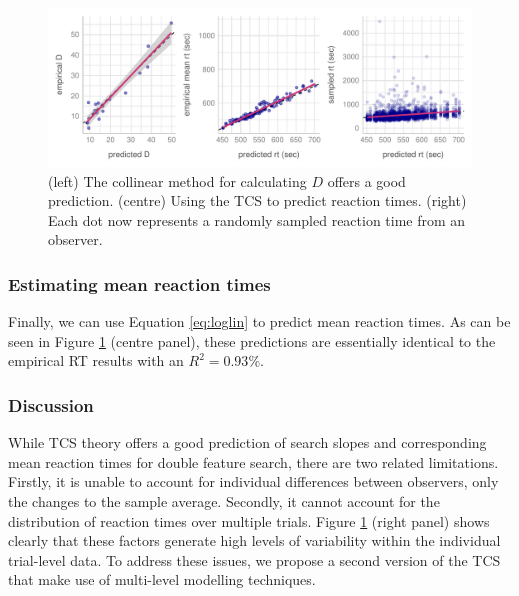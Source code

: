 \documentclass[smallextended, natbib]{svjour3}       %
\begin{document}
\begin{figure}
\centering
\includegraphics[width=\textwidth]{../plots/computational_replication.pdf}
\caption{(left) The collinear method for calculating $D$ offers a good prediction. (centre) Using the TCS to predict reaction times. (right) Each dot now represents a randomly sampled reaction time from an observer.}
\label{fig:comp_rep}
\end{figure}

\subsubsection{Estimating mean reaction times}

Finally, we can use Equation \ref{eq:loglin} to predict mean reaction times. As can be seen in  Figure \ref{fig:comp_rep} (centre panel), these predictions are essentially identical to the empirical RT results with an $R^2 = 0.93\%$.

\subsubsection{Discussion}

While TCS theory offers a good prediction of search slopes and corresponding mean reaction times for double feature search, there are two related limitations. Firstly, it is unable to account for individual differences between observers, only the changes to the sample average. Secondly, it cannot account for the distribution of reaction times over multiple trials. Figure \ref{fig:comp_rep} (right panel) shows clearly that these factors generate high levels of variability within the individual trial-level data. To address these issues, we propose a second version of the TCS that make use of multi-level modelling techniques.
\end{document}

